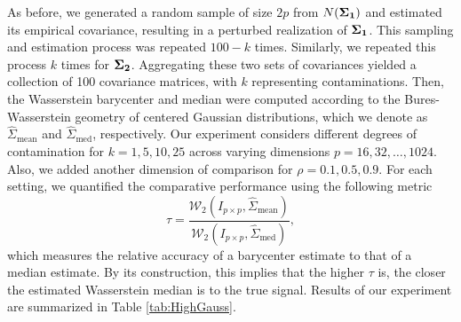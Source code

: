 \documentclass[11pt]{article}
\newcommand{\calW}{\mathcal{W}}
\begin{document}
As before, we generated a random sample of size $2p$ from $N({\bf \Sigma_1})$ and estimated its empirical covariance, resulting in a perturbed realization of ${\bf \Sigma_1}$. This sampling and estimation process was repeated $100-k$ times. Similarly, we repeated this process $k$ times for ${\bf \Sigma_2}$. Aggregating these two sets of covariances yielded a collection of 100 covariance matrices, with $k$ representing contaminations. Then, the Wasserstein barycenter and median were computed according to the Bures-Wasserstein geometry of centered Gaussian distributions, which we denote as $\hat{\Sigma}_{\text{mean}}$ and $\hat{\Sigma}_{\text{med}}$, respectively. Our experiment considers different degrees of contamination for $k=1,5,10,25$ across varying dimensions $p=16,32,\ldots,1024$. Also, we added another dimension of comparison for $\rho=0.1, 0.5, 0.9$. For each setting, we quantified the comparative performance using the following metric
\begin{equation}\label{eq:metric}
\tau = 	\frac{\calW_2(I_{p\times p},\hat{\Sigma}_{\text{mean}} )}{\calW_2(I_{p\times p},\hat{\Sigma}_{\text{med}} )},
\end{equation}
which measures the relative accuracy of a barycenter estimate to that of a median estimate. By its construction, this implies that the higher $\tau$ is, the closer the estimated Wasserstein median is to the true signal. Results of our experiment are summarized in Table \ref{tab:HighGauss}.
\end{document}
